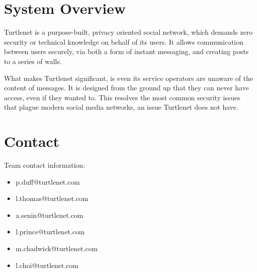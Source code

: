 \section{System Overview}
Turtlenet is a purpose-built, privacy oriented social network, which demands zero 
security or technical knowledge on behalf of its users. It allows communication 
between users securely, via both a form of instant messaging, and creating posts 
to a series of walls.

What makes Turtlenet significant, is even its service operators are unaware of the 
content of messages. It is designed from the ground up that they can never have 
access, even if they wanted to. This resolves the most common security issues that
plague modern social media networks, an issue Turtlenet does not have.

\section{Contact}
Team contact information:
\begin{itemize}
\item p.duff@turtlenet.com
\item l.thomas@turtlenet.com
\item a.senin@turtlenet.com
\item l.prince@turtlenet.com
\item m.chadwick@turtlenet.com
\item l.choi@turtlenet.com
\end{itemize}